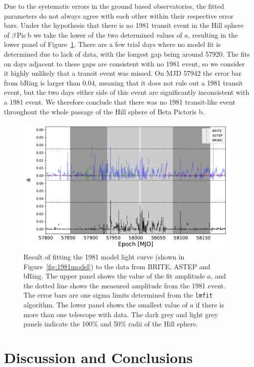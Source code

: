\documentclass[longauth]{aa} %
\newcommand{\bpb}{$\beta$\,Pic\,b}
\begin{document}
Due to the systematic errors in the ground based observatories, the fitted parameters do not always agree with each other within their respective error bars.
%
Under the hypothesis that there is no 1981 transit event in the Hill sphere of \bpb{} we take the lower of the two determined values of $a$, resulting in the lower panel of Figure~\ref{fig:1981fit}.
%
There are a few trial days where no model fit is determined due to lack of data, with the longest gap being around 57920.
%
The fits on days adjacent to these gaps are consistent with no 1981 event, so we consider it highly unlikely that a transit event was missed.
%
On MJD 57942 the error bar from bRing is larger than 0.04, meaning that it does not rule out a 1981 transit event, but the two days either side of this event are significantly inconsistent with a 1981 event.
%
We therefore conclude that there was no 1981 transit-like event throughout the whole passage of the Hill sphere of Beta Pictoris b.

\begin{figure}[htb]
\centering
\includegraphics[width=0.9\linewidth]{fit_to_1981_model.pdf}
\caption{Result of fitting the 1981 model light curve (shown in Figure~\ref{fig:1981model}) to the data from BRITE, ASTEP and bRing. The upper panel shows the value of the fit amplitude $a$, and the dotted line shows the measured amplitude from the 1981 event. The error bars are one sigma limits determined from the {\tt lmfit} algorithm. The lower panel shows the smallest value of $a$ if there is more than one telescope with data. The dark grey and light grey panels indicate the 100\% and 50\% radii of the Hill sphere.}
\label{fig:1981fit}
\end{figure}

\section{Discussion and Conclusions}\label{sec:concl}
\end{document}

